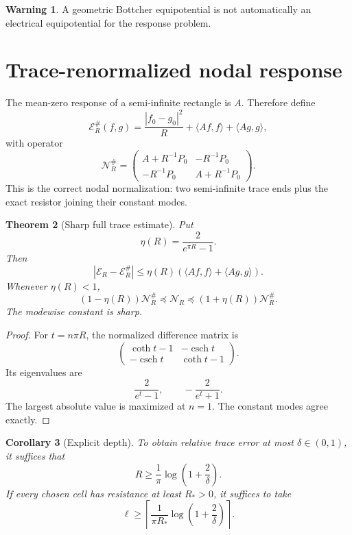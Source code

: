 \documentclass[10pt]{article}
\newtheorem{theorem}{Theorem}[section]
\newtheorem{corollary}[theorem]{Corollary}
\theoremstyle{definition}
\newtheorem{warning}[theorem]{Warning}
\theoremstyle{remark}
\newcommand{\csch}{\operatorname{csch}}
\begin{document}
\begin{warning}
A geometric Bottcher equipotential is not automatically an electrical
equipotential for the response problem.
\end{warning}

\section{Trace-renormalized nodal response}

The mean-zero response of a semi-infinite rectangle is $A$. Therefore define
\[
 \mathcal E_R^{\#}(f,g)
 =\frac{|f_0-g_0|^2}{R}
 +\langle Af,f\rangle+\langle Ag,g\rangle,
\tag{5.1}
\]
with operator
\[
 \mathcal N_R^{\#}=
 \begin{pmatrix}
 A+R^{-1}P_0&-R^{-1}P_0\\
 -R^{-1}P_0&A+R^{-1}P_0
 \end{pmatrix}.
\tag{5.2}
\]
This is the correct nodal normalization: two semi-infinite trace ends plus the
exact resistor joining their constant modes.

\begin{theorem}[Sharp full trace estimate]
Put
\[
 \eta(R)=\frac{2}{e^{\pi R}-1}.
\tag{5.3}
\]
Then
\[
 \left|\mathcal E_R-\mathcal E_R^{\#}\right|
 \le\eta(R)
 \left(\langle Af,f\rangle+\langle Ag,g\rangle\right).
\tag{5.4}
\]
Whenever $\eta(R)<1$,
\[
 \boxed{
 (1-\eta(R))\mathcal N_R^{\#}
 \preceq\mathcal N_R
 \preceq(1+\eta(R))\mathcal N_R^{\#}.}
\tag{5.5}
\]
The modewise constant is sharp.
\end{theorem}

\begin{proof}
For $t=n\pi R$, the normalized difference matrix is
\[
 \begin{pmatrix}
 \coth t-1&-\csch t\\
 -\csch t&\coth t-1
 \end{pmatrix}.
\]
Its eigenvalues are
\[
 \frac{2}{e^t-1},\qquad -\frac{2}{e^t+1}.
\]
The largest absolute value is maximized at $n=1$. The constant modes agree
exactly.
\end{proof}

\begin{corollary}[Explicit depth]
To obtain relative trace error at most $\delta\in(0,1)$, it suffices that
\[
 R\ge\frac1\pi\log\left(1+\frac2\delta\right).
\tag{5.6}
\]
If every chosen cell has resistance at least $R_*>0$, it suffices to take
\[
 \ell\ge
 \left\lceil
 \frac1{\pi R_*}\log\left(1+\frac2\delta\right)
 \right\rceil.
\tag{5.7}
\]
\end{corollary}
\end{document}

